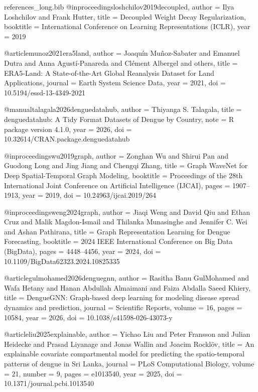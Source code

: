 \begin{filecontents*}[overwrite]{references_long.bib}
@inproceedings{loshchilov2019decoupled,
  author    = {Ilya Loshchilov and Frank Hutter},
  title     = {Decoupled Weight Decay Regularization},
  booktitle = {International Conference on Learning Representations (ICLR)},
  year      = {2019}
}

@article{munoz2021era5land,
  author  = {Joaqu{\'i}n Mu{\~n}oz-Sabater and Emanuel Dutra and Anna Agust{\'i}-Panareda and Cl{\'e}ment Albergel and others},
  title   = {{ERA5-Land}: A State-of-the-Art Global Reanalysis Dataset for Land Applications},
  journal = {Earth System Science Data},
  year    = {2021},
  doi     = {10.5194/essd-13-4349-2021}
}

@manual{talagala2026denguedatahub,
  author = {Thiyanga S. Talagala},
  title  = {denguedatahub: A Tidy Format Datasets of Dengue by Country},
  note   = {R package version 4.1.0},
  year   = {2026},
  doi    = {10.32614/CRAN.package.denguedatahub}
}

@inproceedings{wu2019graph,
  author    = {Zonghan Wu and Shirui Pan and Guodong Long and Jing Jiang and Chengqi Zhang},
  title     = {Graph {WaveNet} for Deep Spatial-Temporal Graph Modeling},
  booktitle = {Proceedings of the 28th International Joint Conference on Artificial Intelligence (IJCAI)},
  pages     = {1907--1913},
  year      = {2019},
  doi       = {10.24963/ijcai.2019/264}
}


@inproceedings{weng2024graph,
  author    = {Jiaqi Weng and David Qiu and Ethan Cruz and Malik Magdon-Ismail and Thilanka Munasinghe and Jennifer C. Wei and Ashan Pathirana},
  title     = {Graph Representation Learning for Dengue Forecasting},
  booktitle = {2024 IEEE International Conference on Big Data (BigData)},
  pages     = {4448--4456},
  year      = {2024},
  doi       = {10.1109/BigData62323.2024.10825335}
}

@article{gulmohamed2026denguegnn,
  author  = {Rasitha Banu GulMohamed and Wafa Hetany and Hanan Abdullah Almaimani and Faiza Abdalla Saeed Khiery},
  title   = {{DengueGNN}: Graph-based deep learning for modeling disease spread dynamics and prediction},
  journal = {Scientific Reports},
  volume  = {16},
  pages   = {10584},
  year    = {2026},
  doi     = {10.1038/s41598-026-43073-y}
}

@article{liu2025explainable,
  author  = {Yichao Liu and Peter Fransson and Julian Heidecke and Prasad Liyanage and Jonas Wallin and Joacim Rockl{\"o}v},
  title   = {An explainable covariate compartmental model for predicting the spatio-temporal patterns of dengue in {Sri Lanka}},
  journal = {PLoS Computational Biology},
  volume  = {21},
  number  = {9},
  pages   = {e1013540},
  year    = {2025},
  doi     = {10.1371/journal.pcbi.1013540}
}


\end{filecontents*}
